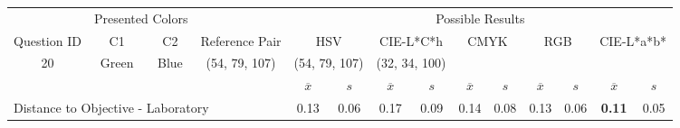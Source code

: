 %
\begin{table}[!htbp]
  \resizebox{\textwidth}{!} {
  \begin{tabular}{lccccccccccccc}
    \hline
    \multicolumn{1}{c}{}                              & \multicolumn{2}{c}{Presented Colors}             &                                                            & \multicolumn{10}{c}{Possible Results}                                                                                                                                                                                                                                                                       \\ \cline{2-3} \cline{5-14}
    \multicolumn{1}{c}{\multirow{-2}{*}{Question ID}} & C1                   & C2                        & \multirow{-2}{*}{Reference Pair}                           & \multicolumn{2}{c}{HSV}                                    & \multicolumn{2}{c}{CIE-L*C*h}                              & \multicolumn{2}{c}{CMYK}                                  & \multicolumn{2}{c}{RGB}                                   & \multicolumn{2}{c}{CIE-L*a*b*}                            \\ \hline
    \multicolumn{1}{c|}{20}                           & Green                & \multicolumn{1}{c|}{Blue} & \multicolumn{1}{c|}{\cellcolor[HTML]{00FFFF}(54, 79, 107)} & \multicolumn{2}{c|}{\cellcolor[HTML]{00FFFF}(54, 79, 107)} & \multicolumn{2}{c|}{\cellcolor[HTML]{00A5FF}(32, 34, 100)} & \multicolumn{2}{c|}{\cellcolor[HTML]{008080}{\color[HTML]{FFFFFF}(12, 17, 23)}} & \multicolumn{2}{c|}{\cellcolor[HTML]{008080}{\color[HTML]{FFFFFF}(12, 17, 23)}} & \multicolumn{2}{c|}{\cellcolor[HTML]{7D93A6}{\color[HTML]{FFFFFF}(26, 28, 40)}} \\ \hline
                                                      & \multicolumn{1}{l}{} & \multicolumn{1}{l}{}      & \multicolumn{1}{l}{}                                       & $\overline{x}$           & $s$                           & $\overline{x}$           & $s$                           & $\overline{x}$          & $s$                           & $\overline{x}$          & $s$                           & $\overline{x}$           & $s$                          \\ \hline
    \multicolumn{4}{l|}{Distance to Objective - Laboratory}                                                                                                            & 0.13                  & \multicolumn{1}{c|}{0.06}          & 0.17                  & \multicolumn{1}{c|}{0.09}          & 0.14                 & \multicolumn{1}{c|}{0.08}          & 0.13                 & \multicolumn{1}{c|}{0.06}          & \textbf{0.11}         & \multicolumn{1}{c|}{0.05}         \\

\end{tabular}}
\end{table}
